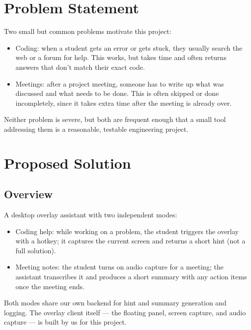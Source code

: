 \documentclass[11pt]{article}
\begin{document}
\section{Problem Statement}
Two small but common problems motivate this project:
\begin{itemize}
  \item Coding: when a student gets an error or gets stuck, they usually search the web or
    a forum for help. This works, but takes time and often returns answers that don't match
    their exact code.
  \item Meetings: after a project meeting, someone has to write up what was discussed and
    what needs to be done. This is often skipped or done incompletely, since it takes extra
    time after the meeting is already over.
\end{itemize}
Neither problem is severe, but both are frequent enough that a small tool addressing them is
a reasonable, testable engineering project.

\section{Proposed Solution}

\subsection{Overview}
A desktop overlay assistant with two independent modes:
\begin{itemize}
  \item Coding help: while working on a problem, the student triggers the overlay with a
    hotkey; it captures the current screen and returns a short hint (not a full solution).
  \item Meeting notes: the student turns on audio capture for a meeting; the assistant
    transcribes it and produces a short summary with any action items once the meeting ends.
\end{itemize}
Both modes share our own backend for hint and summary generation and logging. The overlay
client itself --- the floating panel, screen capture, and audio capture --- is built by us
for this project.
\end{document}
